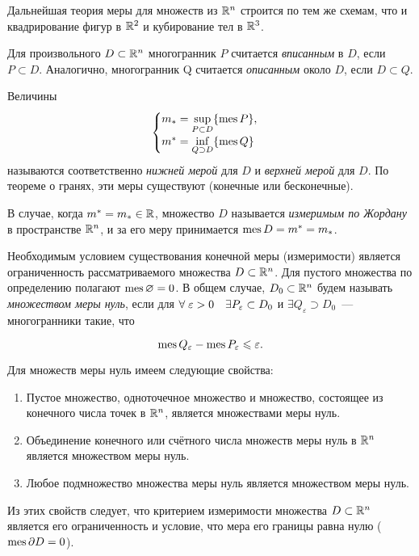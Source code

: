 \documentclass[../../main.tex]{subfiles}
\begin{document}
Дальнейшая теория меры для множеств из $\mathbb{R}^n$ строится по тем же
схемам, что и квадрирование фигур в $\mathbb{R}^2$ и кубирование тел в $\mathbb{R}^3$.

Для произвольного $D \subset \mathbb{R}^n$ многогранник $P$ 
считается \emph{вписанным} в $D$, 
если $P \subset D$. Аналогично, многогранник Q 
считается \emph{описанным} около $D$, если $D \subset Q$.

Величины
\begin{equation}
\begin{cases}
m_* = \underset{P \subset D}{\sup} \{ \operatorname{mes} P \}, \\
m^* = \underset{Q \supset D}{\inf} \{ \operatorname{mes} Q \}
\end{cases}
\end{equation}
называются соответственно \emph{нижней мерой} для $D$ и 
\emph{верхней мерой} для $D$.
По теореме о гранях, эти меры существуют (конечные или бесконечные).

В случае, когда $ m^* = m_* \in \mathbb{R}$,
множество $D$ называется \emph{измеримым по Жордану} в пространстве $\mathbb{R}^n$,
и за его меру принимается $\operatorname{mes} D = m^* = m_*$.

Необходимым условием существования конечной меры (измеримости) 
является ограниченность рассматриваемого множества $D \subset \mathbb{R}^n$. 
Для пустого множества по определению полагают $\operatorname{mes}\varnothing = 0$.
В общем случае, $D_0 \subset \mathbb{R}^n$ будем называть \emph{множеством меры нуль}, 
если для $\forall\; \varepsilon > 0\quad \exists P_\varepsilon \subset D_0$ 
и $\exists Q_\varepsilon \supset D_0$~--- многогранники такие, что

\begin{equation}
\label{614}
\operatorname{mes} Q_\varepsilon - \operatorname{mes} P_\varepsilon \leqslant \varepsilon.
\end{equation}

Для множеств меры нуль имеем следующие свойства:
\begin{enumerate}
	\item Пустое множество, одноточечное множество и множество, 
	состоящее из конечного числа точек в $\mathbb{R}^n$, является множествами меры нуль.
	\item Объединение конечного или счётного числа множеств меры нуль 
	в $\mathbb{R}^n$ является множеством меры нуль.
	\item Любое подмножество множества меры нуль является множеством меры нуль.
\end{enumerate}

Из этих свойств следует, что критерием измеримости множества $D \subset \mathbb{R}^n$ 
является его ограниченность и условие, что мера его границы равна нулю
 ($ \operatorname{mes}\partial D = 0 $).
\end{document}
